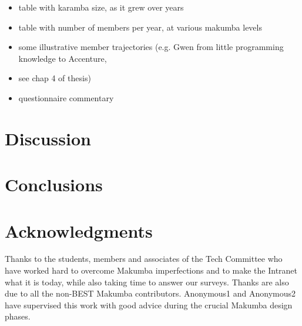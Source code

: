 \documentclass{acm_proc_article-sp}
\begin{document}
\begin{itemize}
\item table with karamba size, as it grew over years
\item table with number of members per year, at various makumba levels
\item some illustrative member trajectories (e.g. Gwen from little programming knowledge to Accenture, \item see chap 4 of thesis)
\item questionnaire commentary
\end{itemize}

\section{Discussion}\label{sec:disco}


\section{Conclusions}\label{sec:conclusions}

\section{Acknowledgments}\label{sec:acknowledgments}
Thanks to the students, members and associates of the Tech Committee who have worked hard to overcome Makumba imperfections and to make the Intranet what it is today, while also taking time to answer our surveys.  Thanks are also due to all the non-BEST Makumba contributors.  Anonymous1 and Anonymous2 have supervised this work with good advice during the crucial Makumba design phases.

%

 

%

\balancecolumns
\end{document}
